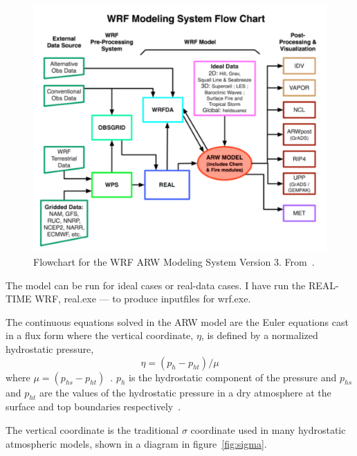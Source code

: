 \begin{figure}
\centering
\includegraphics[width=\textwidth]{model_methods/wrfflowchart}
\caption{Flowchart for the WRF ARW Modeling System Version 3. From~\citet{Wang2015}.}
\label{fig:wrfflowchart}
\end{figure}

The model can be run for ideal cases or real-data cases. I have run the REAL-TIME WRF, real.exe — to produce inputfiles for wrf.exe.

The continuous equations solved in the ARW model are the Euler equations cast in a flux form where the vertical coordinate, $\eta$, is defined by a normalized hydrostatic pressure,
\begin{equation}
\eta = (p_h - p_{ht})/\mu 
\end{equation}
where $\mu = (p_{hs} - p_{ht})$~\citep{Skamarock2008}. $p_h$ is the hydrostatic component of the pressure and $p_{hs}$ and $p_{ht}$ are the values of the hydrostatic pressure in a dry atmosphere at the surface and top boundaries respectively~\citep{Skamarock2008}.

The vertical coordinate is the traditional $\sigma$ coordinate used in many hydrostatic atmospheric models, shown in a diagram in figure~\ref{fig:sigma}.

